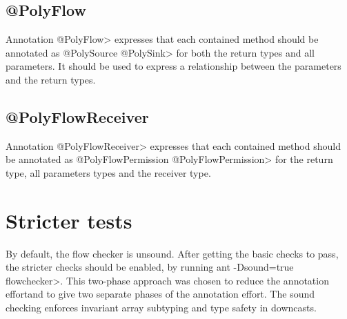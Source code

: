 \subsection{@PolyFlow\label{sec:polyflow}}

Annotation \<@PolyFlow> expresses that each contained method should be
annotated as \<@PolySource @PolySink> for both the return
types and all parameters.  It should be used to express a relationship between the parameters 
and the return types.

\subsection{@PolyFlowReceiver\label{sec:polyflowreceiver}}

Annotation \<@PolyFlowReceiver> expresses that each contained method should be
annotated as \<@PolyFlowPermission @PolyFlowPermission> for  the return
type, all parameters types and the receiver type.  



%
%
%




\section{Stricter tests\label{sec:stricter}}

By default, the flow checker is unsound.  After getting the basic checks to pass, the
 stricter checks should be enabled, by running \<ant -Dsound=true flowchecker>.
This two-phase approach was chosen to reduce
the annotation effortand to give two separate phases of
the annotation effort.
 The sound checking enforces invariant 
array subtyping and type safety in downcasts.


